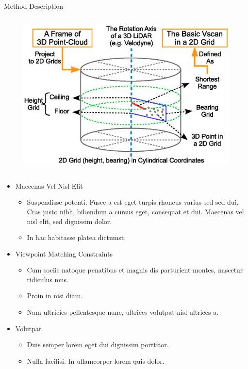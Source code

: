 \documentclass[final,hyperref={pdfpagelabels=false}]{beamer}
\begin{document}
\begin{frame}[t]
\begin{columns}[t]
\begin{column}{0.47\textwidth}
\begin{block}{Method Description}

\begin{columns}
	\begin{column}{0.4\textwidth}
		\begin{figure}
			\centering
			\includegraphics[width=\textwidth]{grid}
		\end{figure}
	\end{column}
\end{columns}

\begin{itemize}
\item Maecenas Vel Nisl Elit
\begin{itemize}
\item Suspendisse potenti. Fusce a est eget turpis rhoncus varius sed sed dui. Cras justo nibh, bibendum a cursus eget, consequat et dui. Maecenas vel nisl elit, sed dignissim dolor. 
\item In hac habitasse platea dictumst.
\end{itemize}

\item Viewpoint Matching Constraints
\begin{itemize}
\item Cum sociis natoque penatibus et magnis dis parturient montes, nascetur ridiculus mus. 
\item Proin in nisi diam.
\item Nam ultricies pellentesque nunc, ultrices volutpat nisl ultrices a.
\end{itemize}

\item Volutpat 
\begin{itemize}
\item Duis semper lorem eget dui dignissim porttitor.
\item Nulla facilisi. In ullamcorper lorem quis dolor.
\end{itemize}
\end{itemize}


\end{block}
\end{column}
\end{columns}
\end{frame}
\end{document}
